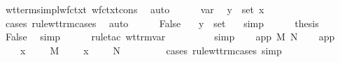 \begin{isabellebody}
\ wt{\isacharunderscore}terms{\isacharunderscore}impl{\isacharunderscore}wf{\isacharunderscore}ctxt\ wf{\isacharunderscore}ctxt{\isacharunderscore}cons\ \isamarkupfalse%
\ auto\isanewline
\ \ \ \ \isamarkupfalse%
\ var\ \isamarkupfalse%
\ {\isachardoublequoteopen}{\isacharparenleft}y{\isacharcomma}{\isasymsigma}{\isacharparenright}\ {\isasymin}\ set\ {\isacharparenleft}{\isacharparenleft}x{\isacharcomma}\ {\isasymtau}{\isacharparenright}\ {\isacharhash}\ {\isasymGamma}{\isacharparenright}{\isachardoublequoteclose}\ \isamarkupfalse%
\ {\isacharparenleft}cases\ rule{\isacharcolon}wt{\isacharunderscore}trm{\isachardot}cases{\isacharparenright}\ \isamarkupfalse%
\ auto\isanewline
\ \ \ \ \isamarkupfalse%
\ False\ \isamarkupfalse%
\ {}{\isacharcolon}\ {\isachardoublequoteopen}{\isacharparenleft}y{\isacharcomma}{\isasymsigma}{\isacharparenright}\ {\isasymin}\ set\ {\isasymGamma}{\isachardoublequoteclose}\ \isamarkupfalse%
\ simp\isanewline
\isanewline
\ \ \ \ \isamarkupfalse%
\ {\isacharquery}thesis\isanewline
\ \ \ \ \isamarkupfalse%
\ False\ \isamarkupfalse%
\ simp\isanewline
\ \ \ \ \isamarkupfalse%
\ {\isacharparenleft}rule{\isacharunderscore}tac\ wt{\isacharunderscore}trm{\isachardot}var{\isacharparenright}\isanewline
\ \ \ \ \isamarkupfalse%
\ {}\ {}\ \isamarkupfalse%
\ simp{\isacharplus}\isanewline
\ \ \isamarkupfalse%
\isanewline
{}\isamarkupfalse%
\isanewline
{}\isamarkupfalse%
\ {\isacharparenleft}app\ M{\isacharprime}\ N{\isacharprime}{\isacharparenright}\isanewline
\ \ \isamarkupfalse%
\ app{\isacharparenleft}{}{\isacharparenright}\ \isamarkupfalse%
\ {\isasympi}\ \ \ {\isachardoublequoteopen}{\isacharparenleft}x{\isacharcomma}\ {\isasymtau}{\isacharparenright}\ {\isacharhash}\ {\isasymGamma}\ {\isasymturnstile}\ M{\isacharprime}\ {\isacharcolon}\ {\isasympi}\ {\isasymrightarrow}\ {\isasymsigma}{\isachardoublequoteclose}\ {\isachardoublequoteopen}{\isacharparenleft}x{\isacharcomma}\ {\isasymtau}{\isacharparenright}\ {\isacharhash}\ {\isasymGamma}\ {\isasymturnstile}\ N{\isacharprime}\ {\isacharcolon}\ {\isasympi}{\isachardoublequoteclose}\ \isanewline
\ \ \ \ \isamarkupfalse%
\ {\isacharparenleft}cases\ rule{\isacharcolon}wt{\isacharunderscore}trm{\isachardot}cases{\isacharcomma}\ simp{\isacharparenright}\isanewline

\end{isabellebody}
